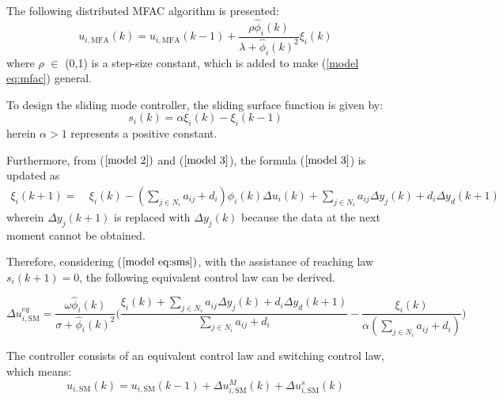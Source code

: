 \documentclass[journal,onecolumn]{IEEEtran}
\begin{document}
The following distributed MFAC algorithm is presented:
\begin{equation}
    \label{model eq:mfac}
    u_{i,\text{MFA}}(k) = u_{i,\text{MFA}}(k - 1) + \frac{\rho \hat{\phi}_i(k)}{\lambda + \hat{\phi}_i(k)^2} \xi_i(k)
\end{equation}
where \(\rho\) \(\in\) (0,1) is a step-size constant, which is added to make (\ref{model eq:mfac}) general. 

To design the sliding mode controller, the sliding surface function is given by:
\begin{equation}
    \label{model eq:sms}
    s_i(k) = \alpha \xi_i(k) - \xi_i(k-1)
\end{equation}
herein $ \alpha > 1$ represents a positive constant.

Furthermore, from ($ \ref{model 2}) $ and ($ \ref{model 3} $), the formula ($ \ref{model 3} $) is updated as
\begin{align}
    \label{model eq:xi_next}
    \xi_i(k+1) =\ & \xi_i(k) - (\sum_{j \in N_i} a_{ij} + d_i ) \phi_i(k) \Delta u_i(k) + \sum_{j \in N_i} a_{ij} \Delta y_j(k) + d_i \Delta y_d(k+1)
\end{align}
wherein $\Delta y_j(k+1)$ is replaced with $ \Delta y_j(k) $ because the data at the next moment cannot be obtained.




Therefore, considering ($ \ref{model eq:sms}) $, with the assistance of reaching law $ s_i(k+1) = 0 $, the following equivalent control law can be derived.

\begin{equation}
    \label{model eq:equivalent_control}
    \Delta u_{i,\text{SM}}^{eq} = \frac{\omega \hat{\phi}_i(k)}{\sigma + \hat{\phi}_i(k)^2}\bigg(\frac{\xi_i(k)+ \sum_{j \in N_i}a_{ij} \Delta y_j(k) + d_i \Delta y_d(k+1)}{\displaystyle \sum_{j \in N_i}a_{ij}+d_i} - \frac{\xi_i(k)}{\alpha(\displaystyle \sum_{j \in N_i}a_{ij}+d_i)} 
    \bigg)
\end{equation}

The controller consists of an equivalent control law and switching control law, which means:
\begin{equation}
    \label{model eq:u}
    u_{i,\text{SM}}(k) = u_{i,\text{SM}}(k-1) + \Delta u_{i,\text{SM}}^M(k)+ \Delta u_{i,\text{SM}}^s(k)
\end{equation}
\end{document}
